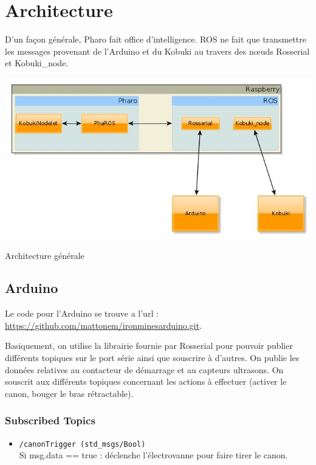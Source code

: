 \documentclass[a4paper, 11pt]{article}
\begin{document}
\section{Architecture}

D'un façon générale, Pharo fait office d'intelligence. ROS ne fait que
transmettre les messages provenant de l'Arduino et du Kobuki au travers
des n{\oe}uds Rosserial et Kobuki\_node.
\begin{center}
  \includegraphics[width=\linewidth]{./architecture.jpg}
  \caption{Architecture générale}
  \label{archi_generale}
\end{center}
\subsection{Arduino}
Le code pour l'Arduino se trouve a l'url
:\\ \url{https://github.com/mattonem/ironminesarduino.git}.

Basiquement, on utilise la librairie fournie par Rosserial pour
pouvoir publier différents topiques sur le port série ainsi que souscrire
à d'autres. On publie les données relatives au contacteur de démarrage
et au capteurs ultrasons. On souscrit aux différents topiques concernant
les actions à effectuer (activer le canon, bouger le bras
rétractable).

\subsubsection{Subscribed Topics}

\begin{itemize}
\item \texttt{/canonTrigger (std\_msgs/Bool)}\\ 
  Si msg.data == true :
  déclenche l'électrovanne pour faire tirer le canon.
\end{itemize}
\end{document}
